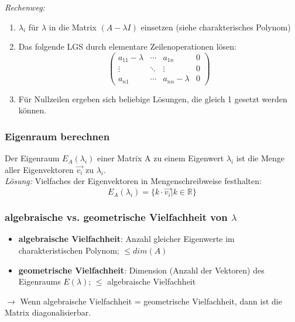 \textit{Rechenweg:}

\begin{enumerate}
    \item \(\lambda_i\) für \(\lambda\) in die Matrix \((A-\lambda I)\) einsetzen (siehe charakterisches Polynom)
    \item Das folgende LGS durch elementare Zeilenoperationen lösen:\\
        \begin{equation*}
            \left( 
            \begin{array}{ccc|c}
                a_{11} - \lambda & \cdots & a_{1n} & 0\\
                \vdots & \ddots & \vdots & 0\\
                a_{n1} & \cdots & a_{nn} - \lambda & 0
            \end{array}
            \right)
        \end{equation*}
    \item Für Nullzeilen ergeben sich beliebige Lösungen, die gleich 1 gesetzt werden können.
\end{enumerate}


\subsubsection{Eigenraum berechnen}

Der Eigenraum \(E_A(\lambda_i)\) einer Matrix A zu einem Eigenwert \(\lambda_i\) ist die Menge aller Eigenvektoren \(\vec{v_i}\) zu \(\lambda_i\).\\

\textit{Lösung:}
Vielfaches der Eigenvektoren in Mengenschreibweise festhalten:\\

\begin{equation*}
    E_A(\lambda_i) = \{ k \cdot \vec{v_i} | k \in \mathbb{R} \}   
\end{equation*}

\subsubsection{algebraische vs. geometrische Vielfachheit von \(\lambda\)}
\begin{itemize}
    \item \textbf{algebraische Vielfachheit}: Anzahl gleicher Eigenwerte im charakteristischen Polynom; \(\leq dim(A)\)
    \item \textbf{geometrische Vielfachheit}: Dimension (Anzahl der Vektoren) des Eigenraums \(E(\lambda)\); \(\leq\) algebraische Vielfachheit
\end{itemize}

\(\rightarrow\) Wenn algebraische Vielfachheit = geometrische Vielfachheit, dann ist die Matrix diagonalisierbar.